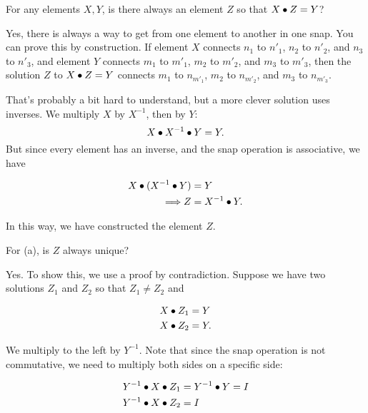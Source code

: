 \documentclass[../gatm_answers.tex]{subfiles}
\begin{document}
\begin{outer_problem}
	\item
\end{outer_problem}

\begin{inner_problem}[start=1]
	\item For any elements $X, Y$, is there always an element $Z$ so that $X\bullet Z=Y$?
\end{inner_problem}

Yes, there is always a way to get from one element to another in one snap. You can prove this by construction. If element $X$ connects $n_1$ to $n'_1$, $n_2$ to $n'_2$, and $n_3$ to $n'_3$, and element $Y$ connects $m_1$ to $m'_1$, $m_2$ to $m'_2$, and $m_3$ to $m'_3$, then the solution $Z$ to $X\bullet Z=Y$ connects $m_1$ to $n_{m'_1}$, $m_2$ to $n_{m'_2}$, and $m_3$ to $n_{m'_3}$.

That's probably a bit hard to understand, but a more clever solution uses inverses. We multiply $X$ by $X^{-1}$, then by $Y$: $$X\bullet X^{-1}\bullet Y = Y.$$ But since every element has an inverse, and the snap operation is associative, we have

\begin{align*}
X\bullet (X^{-1} \bullet Y) &= Y \\
\Longrightarrow Z &= X^{-1} \bullet Y.
\end{align*}

In this way, we have constructed the element $Z$.

\begin{inner_problem}
	\item For (a), is $Z$ always unique?
\end{inner_problem}

Yes. To show this, we use a proof by contradiction. Suppose we have two solutions $Z_1$ and $Z_2$ so that $Z_1\neq Z_2$ and

\begin{align*}
X\bullet Z_1 &= Y \\
X\bullet Z_2 &= Y.
\end{align*}

We multiply to the left by $Y^{-1}$. Note that since the snap operation is not commutative, we need to multiply both sides on a specific side:

\begin{align*}
Y^{-1} \bullet X\bullet Z_1 &= Y^{-1} \bullet Y = I \\
Y^{-1} \bullet X\bullet Z_2 &= I
\end{align*}
\end{document}
